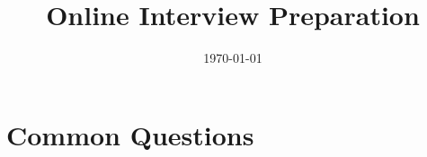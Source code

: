 



\title{Online Interview Preparation}

\author{\myName{}}
\date{\today}
\makeatletter
\fancyfoot[L]{\scshape \MakeLowercase{\@author}}
\fancyfoot[R]{{\scshape \MakeLowercase{\@title}}\quad{\LARGE\sfrac{\thepage}{\pageref*{LastPage}}}}
\makeatother



\maketitle%
\thispagestyle{fancy}

\tableofcontents

\section{Common Questions}


